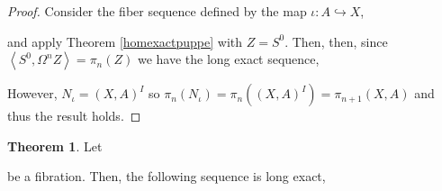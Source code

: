 \documentclass[12pt]{extarticle}
\newcommand{\homspace}[2]{\left< #1, #2 \right>}
\theoremstyle{definition}
\newtheorem{theorem}{Theorem}[section]
\begin{document}
\begin{proof}
Consider the fiber sequence defined by the map $\iota : A \hookrightarrow X$, 
\begin{center}
\end{center}
and apply Theorem \ref{homexactpuppe} with $Z = S^0$. Then, then, since $\homspace{S^0}{\Omega^n Z} = \pi_n(Z)$ we have the long exact sequence,
\begin{center}
\end{center}
However, $N_\iota = (X, A)^I$ so $\pi_n(N_\iota) = \pi_n((X, A)^I) = \pi_{n+1}(X, A)$ and thus the result holds.
\end{proof}



\begin{theorem}
Let 
\begin{center}
\end{center}
be a fibration. Then, the following sequence is long exact,
\begin{center}
\end{center}
\end{theorem}
\end{document}
